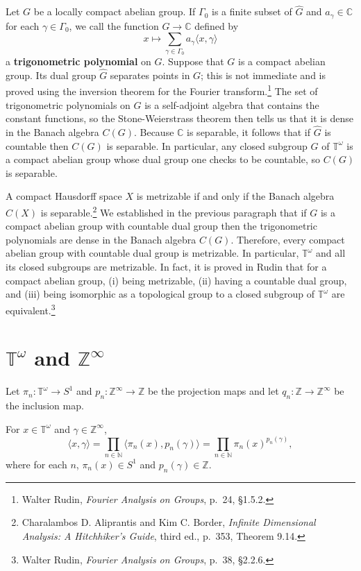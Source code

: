 \documentclass{article}
\newcommand{\inner}[2]{\langle #1, #2 \rangle}
\begin{document}
Let $G$ be a locally compact abelian group.
If $\Gamma_0$ is a finite subset of $\widehat{G}$ and $a_\gamma \in \mathbb{C}$ for each $\gamma \in \Gamma_0$,
we call the function $G \to \mathbb{C}$ defined by
\[
x \mapsto \sum_{\gamma \in \Gamma_0} a_\gamma \inner{x}{\gamma}
\]
a \textbf{trigonometric polynomial} on $G$.
Suppose that $G$ is a compact abelian group.  Its dual group $\widehat{G}$ separates points in $G$; this is not immediate and is proved using the inversion
theorem for the Fourier transform.\footnote{Walter Rudin, {\em Fourier Analysis on Groups}, p.~24, \S 1.5.2.}
The set of trigonometric polynomials on $G$ is a self-adjoint algebra that contains the constant functions,
so the Stone-Weierstrass theorem then tells us that it is dense in the Banach algebra $C(G)$. 
Because $\mathbb{C}$ is separable, it follows that if $\widehat{G}$ is countable then $C(G)$ is separable. 
In particular, any closed subgroup $G$ of $\mathbb{T}^\omega$ is a compact abelian group whose dual group one checks to be countable, so
$C(G)$ is separable.

A compact Hausdorff space $X$ is metrizable if and only if the Banach algebra $C(X)$ is separable.\footnote{Charalambos D. Aliprantis and Kim C. Border,
{\em Infinite Dimensional Analysis: A Hitchhiker's Guide}, third ed., p.~353, Theorem 9.14.} 
We established in the previous paragraph that if $G$ is a compact abelian group with countable dual group then the trigonometric polynomials are dense in the Banach
algebra $C(G)$. Therefore, every compact abelian group with countable dual group is metrizable. In particular, $\mathbb{T}^\omega$ and all its closed subgroups
are metrizable. In fact, it is proved in Rudin that for a compact abelian group, (i) being metrizable, (ii) having a countable dual group, and (iii) being isomorphic as a topological group
to a closed subgroup of $\mathbb{T}^\omega$ are equivalent.\footnote{Walter Rudin, {\em Fourier Analysis on Groups},
p.~38, \S 2.2.6.}



\section{$\mathbb{T}^\omega$ and $\mathbb{Z}^\infty$}
Let $\pi_n:\mathbb{T}^\omega \to S^1$ and
$p_n:\mathbb{Z}^\infty \to \mathbb{Z}$ be the projection maps and let $q_n:\mathbb{Z} \to \mathbb{Z}^\infty$ be the inclusion map.

For $x \in \mathbb{T}^\omega$
and $\gamma \in \mathbb{Z}^\infty$,
\[
\inner{x}{\gamma} = \prod_{n \in \mathbb{N}} \inner{\pi_n(x)}{p_n(\gamma)} = \prod_{n \in \mathbb{N}} \pi_n(x)^{p_n(\gamma)},
\]
where for each $n$, $\pi_n(x) \in S^1$ and $p_n(\gamma) \in \mathbb{Z}$. 
\end{document}
